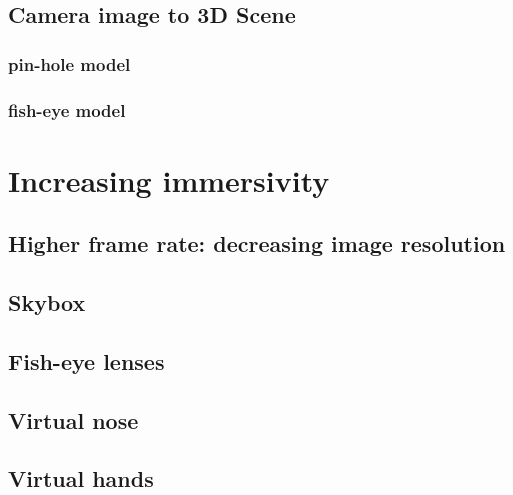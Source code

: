 \subsection{Camera image to 3D Scene}

\subsubsection{pin-hole model}
\subsubsection{fish-eye model}



\section{Increasing immersivity}

\subsection{Higher frame rate: decreasing image resolution}

\subsection{Skybox}

\subsection{Fish-eye lenses}

\subsection{Virtual nose}

\subsection{Virtual hands}